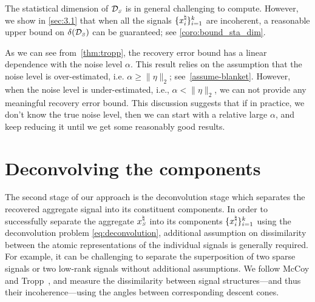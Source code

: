 The statistical dimension of $\mathcal{D}_{\scriptscriptstyle S}$ is in general challenging to compute. However, we show in \autoref{sec:3.1} that when all the signals $\{x_i^{\natural}\}_{i=1}^k$ are incoherent, a reasonable upper bound on $\delta(\mathcal{D}_{\scriptscriptstyle S})$ can be guaranteed; see \autoref{coro:bound_sta_dim}.

As we can see from~\autoref{thm:tropp}, the recovery error bound has a linear dependence with the noise level $\alpha$. This result relies on the assumption that the noise level is over-estimated, i.e. $\alpha \geq \|\eta\|_2$; see~\autoref{assume-blanket}. However, when the noise level is under-estimated, i.e., $\alpha < \|\eta\|_2$, we can not provide any meaningful recovery error bound. This discussion suggests that if in practice, we don't know the true noise level, then we can start with a relative large $\alpha$, and keep reducing it until we get some reasonably good results.

\section{Deconvolving the components}\label{sec:3}

The second stage of our approach is the deconvolution stage which separates the recovered aggregate signal into its constituent components. In order to successfully separate the aggregate $x_{\scriptscriptstyle S}^{\natural}$ into its components $\{x_i^{\natural}\}_{i=1}^k$ using the deconvolution problem \eqref{eq:deconvolution}, additional assumption on dissimilarity between the atomic representations of the individual signals is generally required. For example, it can be challenging to separate the superposition of two sparse signals or two low-rank signals without additional assumptions. We follow McCoy and Tropp~\cite{mccoy2013achievable}, and measure the dissimilarity between signal structures---and thus their incoherence---using the angles between corresponding descent cones.

